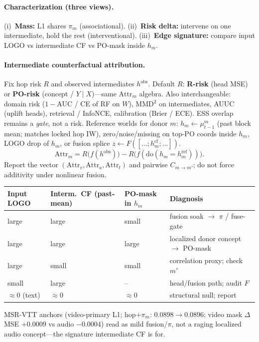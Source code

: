 \paragraph{Characterization (three views).}
(i)~\textbf{Mass:} L1 shares $\pi_m$ (associational).
(ii)~\textbf{Risk delta:} intervene on one intermediate, hold the rest
(interventional).
(iii)~\textbf{Edge signature:} compare input LOGO vs intermediate CF vs
PO-mask inside $h_m$.

\paragraph{Intermediate counterfactual attribution.}
Fix hop risk $R$ and observed intermediates $h^{\mathrm{obs}}$.
Default $R$: \textbf{R-risk} (head MSE) or \textbf{PO-risk} (concept /
$Y\mid X$)---same $\mathrm{Attr}_m$ algebra.
Also interchangeable: domain risk ($1{-}$AUC / CE of RF on $W$),
MMD$^2$ on intermediates, AUUC (uplift heads), retrieval / InfoNCE,
calibration (Brier / ECE).
ESS overlap remains a \emph{gate}, not a risk.
Reference worlds for donor $m$:
$h_m\leftarrow\mu_{t-1}^m$ (past block mean; matches locked hop IW),
zero/noise/missing on top-PO coords inside $h_m$,
LOGO drop of $h_m$,
or fusion splice $z\leftarrow F([\ldots;h_m^{\mathrm{cf}};\ldots])$.
\[
  \mathrm{Attr}_m
  =
  R\!\bigl(f(h^{\mathrm{obs}})\bigr)
  -
  R\!\bigl(f(\mathrm{do}(h_m=h_m^{\mathrm{ref}}))\bigr).
\]
Report the vector $(\mathrm{Attr}_v,\mathrm{Attr}_a,\mathrm{Attr}_t)$ and
pairwise $C_{m\to m'}$; do not force additivity under nonlinear fusion.

\begin{center}
\small
\begin{tabular}{@{}lll l@{}}
\toprule
Input LOGO & Interm.\ CF (past-mean) & PO-mask in $h_m$ & Diagnosis \\
\midrule
large & large & small & fusion soak $\to$ $\pi$ / fuse-gate \\
large & large & large & localized donor concept $\to$ PO-mask \\
large & small & small & correlation proxy; check $m'$ \\
small & large & -- & head/fusion path; audit $F$ \\
$\approx 0$ (text) & $\approx 0$ & $\approx 0$ & structural null; report \\
\bottomrule
\end{tabular}
\end{center}

\noindent MSR-VTT anchors (video-primary L1; hop$+\pi_m$: $0.0898\to 0.0896$;
video mask $\Delta$MSE $+0.0009$ vs audio $-0.0004$) read as mild fusion/$\pi$,
not a raging localized audio concept---the signature intermediate CF is for.


